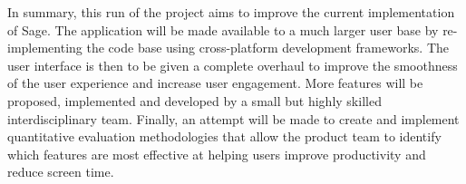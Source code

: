 In summary, this run of the project aims to improve the current implementation of Sage. The application will be made available to a much larger user base by re-implementing the code base using cross-platform development frameworks. The user interface is then to be given a complete overhaul to improve the smoothness of the user experience and increase user engagement. More features will be proposed, implemented and developed by a small but highly skilled interdisciplinary team. Finally, an attempt will be made to create and implement quantitative evaluation methodologies that allow the product team to identify which features are most effective at helping users improve productivity and reduce screen time.
